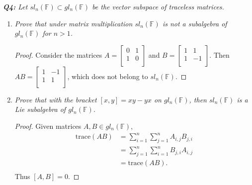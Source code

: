 \documentclass{article}
\begin{document}
\it \textbf{Q4:} Let $sl_n(\mathbb{F})\subset gl_n(\mathbb{F})$ be the
  vector subspace of traceless matrices.
  \begin{enumerate}[label={\bf(\alph*)}]
    \item \it Prove that under matrix multiplication $sl_n(\mathbb{F})$ is
      not a subalgebra of $gl_n(\mathbb{F})$ for $n>1$.
      \begin{proof}
        Consider the matrices $A=\begin{bmatrix}0&1\\1&0\\\end{bmatrix}$
        and $B=\begin{bmatrix}1&1\\1&-1\\\end{bmatrix}$. Then
        $AB=\begin{bmatrix}1&-1\\1&1\\\end{bmatrix}$, which does not belong
        to $sl_n(\mathbb{F})$.
      \end{proof}

    \item \it Prove that with the bracket $[x,y]=xy-yx$ on
      $gl_n(\mathbb{F})$, then $sl_n(\mathbb{F})$ is a Lie subalgebra of
      $gl_n(\mathbb{F})$.
      \begin{proof}
        Given matrices $A,B\in gl_n(\mathbb{F})$,
        \begin{align*}
          \text{trace}(AB) &=\sum_{i=1}^n\sum_{j=1}^nA_{i,j}B_{j,i}\\
          &=\sum_{j=1}^n\sum_{i=1}^nB_{j,i}A_{i,j}\\
          &=\text{trace}(AB).\\
        \end{align*}
        Thus $[A,B]=0$.
      \end{proof}
  \end{enumerate}
\end{document}
